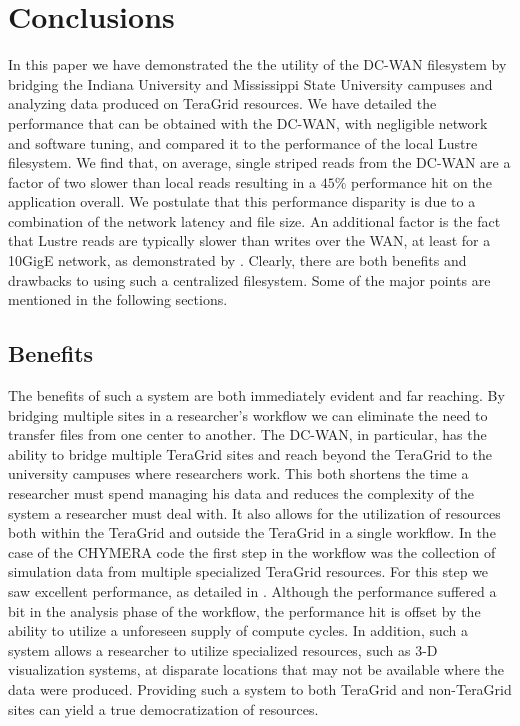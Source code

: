 \documentclass[]{sig-alternate}
\begin{document}
\section{Conclusions}\label{sec:conclusions}
In this paper we have demonstrated the the utility of the DC-WAN filesystem by bridging the Indiana University and Mississippi State University campuses and analyzing data produced on TeraGrid resources. We have detailed the performance that can be obtained with the DC-WAN, with negligible network and software tuning, and compared it to the performance of the local Lustre filesystem. We find that, on average, single striped reads from the DC-WAN are a factor of two slower than local reads resulting in a $45\%$ performance hit on the application overall. We postulate that this performance disparity is due to a combination of the network latency and file size. An additional factor is the fact that Lustre reads are typically slower than writes over the WAN, at least for a 10GigE network, as demonstrated by \cite{simms2007a}. Clearly, there are both benefits and drawbacks to using such a centralized filesystem. Some of the major points are mentioned in the following sections. 
\subsection{Benefits}
The benefits of such a system are both immediately evident and far reaching. By bridging multiple sites in a researcher's workflow we can eliminate the need to transfer files from one center to another. The DC-WAN, in particular, has the ability to bridge multiple TeraGrid sites and reach beyond the TeraGrid to the university campuses where researchers work. This both shortens the time a researcher must spend managing his data and reduces the complexity of the system a researcher must deal with. It also allows for the utilization of resources both within the TeraGrid and outside the TeraGrid in a single workflow. In the case of the CHYMERA code the first step in the workflow was the collection of simulation data from multiple specialized TeraGrid resources. For this step we saw excellent performance, as detailed in \cite{henschel2010}. Although the performance suffered a bit in the analysis phase of the workflow, the performance hit is offset by the ability to utilize a unforeseen supply of compute cycles. In addition, such a system allows a researcher to utilize specialized resources, such as 3-D visualization systems, at disparate locations that may not be available where the data were produced. Providing such a system to both TeraGrid and non-TeraGrid sites can yield a true democratization of resources.
\end{document}
